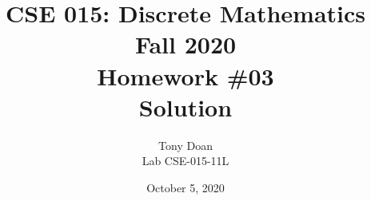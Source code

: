 \documentclass[11pt]{article}
\begin{document}
\author{Tony Doan\\
Lab CSE-015-11L }

\title{CSE 015: Discrete Mathematics\\
Fall 2020\\
Homework \#03\\
Solution}

\date{October 5, 2020}
\maketitle

\end{document}
